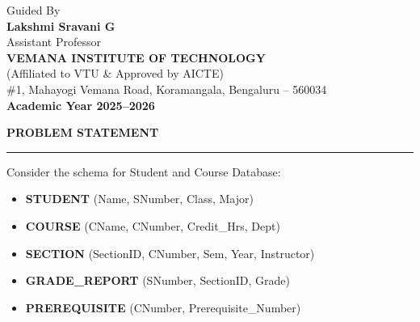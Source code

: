 \documentclass[12pt,a4paper]{report}
\begin{document}
\begin{titlepage}
{\Large Guided By}\\[0.3cm]

{\Large\bfseries Lakshmi Sravani G}\\[0.2cm]

{\large Assistant Professor}\\[0.8cm]

{\Large\bfseries VEMANA INSTITUTE OF TECHNOLOGY}\\[0.2cm]

{\normalsize (Affiliated to VTU \& Approved by AICTE)}\\[0.2cm]

{\normalsize \#1, Mahayogi Vemana Road, Koramangala, Bengaluru -- 560034}\\[0.6cm]

{\Large\bfseries Academic Year 2025--2026}

\end{titlepage}

\newpage


\vspace*{1cm}

\begin{center}
\Large\textbf{PROBLEM STATEMENT}
\end{center}

\hrule
\vspace{0.4cm}

Consider the schema for Student and Course Database:

\vspace{0.2cm}

\begin{itemize}
\item \textbf{STUDENT} (Name, SNumber, Class, Major)
\item \textbf{COURSE} (CName, CNumber, Credit\_Hrs, Dept)
\item \textbf{SECTION} (SectionID, CNumber, Sem, Year, Instructor)
\item \textbf{GRADE\_REPORT} (SNumber, SectionID, Grade)
\item \textbf{PREREQUISITE} (CNumber, Prerequisite\_Number)
\end{itemize}
\end{document}
